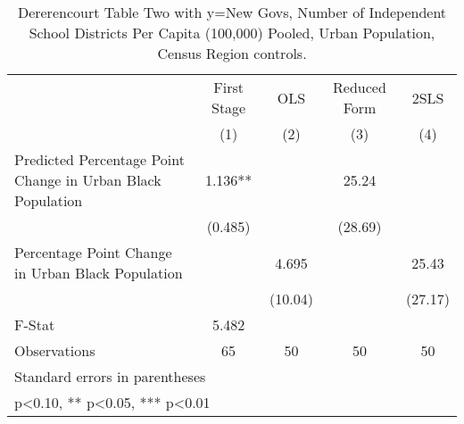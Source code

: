 \begin{table}[htbp]\centering
\def\sym#1{\ifmmode^{#1}\else\(^{#1}\)\fi}
\caption{Dererencourt Table Two with y=New Govs, Number of Independent School Districts Per Capita (100,000) Pooled, Urban Population, Census Region controls.}
\begin{tabular}{l*{4}{c}}
\toprule
                    & First Stage   &         OLS   &Reduced Form   &        2SLS   \\
                    &\multicolumn{1}{c}{(1)}   &\multicolumn{1}{c}{(2)}   &\multicolumn{1}{c}{(3)}   &\multicolumn{1}{c}{(4)}   \\
\midrule
Predicted Percentage Point Change in Urban Black Population&       1.136** &               &       25.24   &               \\
                    &     (0.485)   &               &     (28.69)   &               \\
\addlinespace
Percentage Point Change in Urban Black Population&               &       4.695   &               &       25.43   \\
                    &               &     (10.04)   &               &     (27.17)   \\
\midrule
F-Stat              &       5.482   &               &               &               \\
Observations        &          65   &          50   &          50   &          50   \\
\bottomrule
\multicolumn{5}{l}{\footnotesize Standard errors in parentheses}\\
\multicolumn{5}{l}{\footnotesize * p<0.10, ** p<0.05, *** p<0.01}\\
\end{tabular}
\end{table}
